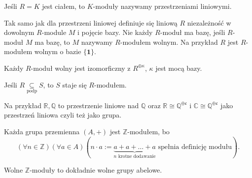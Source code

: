 \begin{remark}
	Jeśli $R=K$ jest ciałem, to $K$-moduły nazywamy przestrzeniami liniowymi. 

	Tak samo jak dla przestrzeni liniowej definiuje się liniową $R$ niezależność w dowolnym $R$-module $M$ i pojęcie bazy. Nie każdy $R$-moduł ma bazę, jeśli $R$-moduł $M$ ma bazę, to $M$ nazywamy $R$-modułem wolnym. Na przykład $R$ jest $R$-modułem wolnym o bazie $\{\mathbf{1}\} $. 

	Każdy $R$-moduł wolny jest izomorficzny z $R^{\oplus \kappa}$, $\kappa$ jest mocą bazy. 

	\noindent Jeśli $R\underset{\scriptscriptstyle\text{podp}}{\subseteq} S$, to $S$ staje się $R$-modułem.

	Na przykład $\mathbb{R} ,\mathbb{Q} $ to przestrzenie liniowe nad $\mathbb{Q} $ oraz $\mathbb{R} \cong \mathbb{Q} ^{\oplus \mathfrak{c}}$ i $\mathbb{C} \cong  \mathbb{Q} ^{\oplus \mathfrak{c}}$ jako przestrzeń liniowa czyli też jako grupa. 

	Każda grupa przemienna $\left( A,+ \right) $ jest $\mathbb{Z} $-modułem, bo
	\[
	\left(\forall n\in \mathbb{Z}  \right) \left(\forall a \in A \right)\left( n\cdot a := \underbrace{a+a+\ldots+a}_{n\text{ krotne dodawanie}} \text{ spełnia definicję modułu}\right)  
	.\] 

	Wolne $\mathbb{Z} $-moduły to dokładnie wolne grupy abelowe.
\end{remark} 



